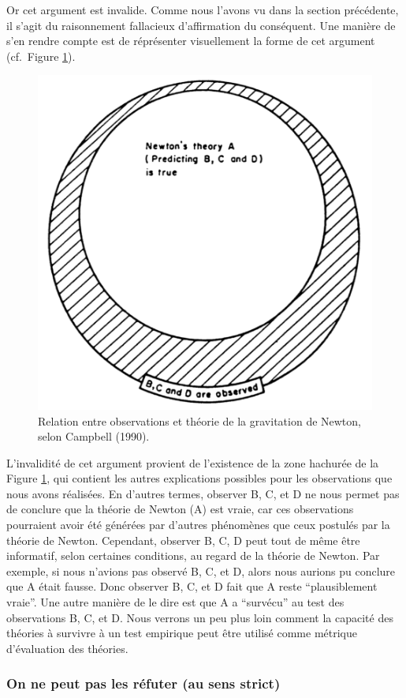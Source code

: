 \documentclass[
  a4paper,11pt,twoside,onecolumn,openright,final,oldfontcommands]{memoir}
\theoremstyle{definition}
\theoremstyle{definition}
\theoremstyle{definition}
\theoremstyle{definition}
\theoremstyle{remark}
\begin{document}
Or cet argument est invalide. Comme nous l'avons vu dans la section précédente, il s'agit du raisonnement fallacieux d'affirmation du conséquent. Une manière de s'en rendre compte est de réprésenter visuellement la forme de cet argument (cf.~Figure \ref{fig:campbell}).

\begin{figure}[!htb]

{\centering \includegraphics[width=0.5\linewidth]{figures/campbell} 

}

\caption{Relation entre observations et théorie de la gravitation de Newton, selon Campbell (1990).}\label{fig:campbell}
\end{figure}

L'invalidité de cet argument provient de l'existence de la zone hachurée de la Figure \ref{fig:campbell}, qui contient les autres explications possibles pour les observations que nous avons réalisées. En d'autres termes, observer B, C, et D ne nous permet pas de conclure que la théorie de Newton (A) est vraie, car ces observations pourraient avoir été générées par d'autres phénomènes que ceux postulés par la théorie de Newton. Cependant, observer B, C, D peut tout de même être informatif, selon certaines conditions, au regard de la théorie de Newton. Par exemple, si nous n'avions pas observé B, C, et D, alors nous aurions pu conclure que A était fausse. Donc observer B, C, et D fait que A reste ``plausiblement vraie''. Une autre manière de le dire est que A a ``survécu'' au test des observations B, C, et D. Nous verrons un peu plus loin comment la capacité des théories à survivre à un test empirique peut être utilisé comme métrique d'évaluation des théories.

\hypertarget{on-ne-peut-pas-les-ruxe9futer-au-sens-strict}{%
\subsubsection{On ne peut pas les réfuter (au sens strict)}\label{on-ne-peut-pas-les-ruxe9futer-au-sens-strict}}
\end{document}
